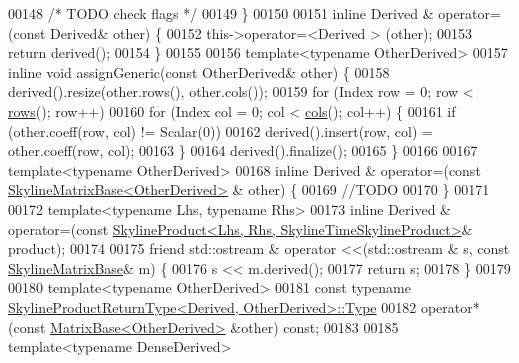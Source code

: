 \begin{DoxyCode}
00148         \textcolor{comment}{/* TODO check flags */}
00149     \}
00150 
00151     \textcolor{keyword}{inline} Derived & operator=(\textcolor{keyword}{const} Derived& other) \{
00152         this->\textcolor{keyword}{operator}=<Derived > (other);
00153         \textcolor{keywordflow}{return} derived();
00154     \}
00155 
00156     \textcolor{keyword}{template}<\textcolor{keyword}{typename} OtherDerived>
00157     \textcolor{keyword}{inline} \textcolor{keywordtype}{void} assignGeneric(\textcolor{keyword}{const} OtherDerived& other) \{
00158         derived().resize(other.rows(), other.cols());
00159         \textcolor{keywordflow}{for} (Index row = 0; row < \hyperlink{class_eigen_1_1_skyline_matrix_base_a8243b2fe6bcc6c3037717fcb0afa9d46}{rows}(); row++)
00160             \textcolor{keywordflow}{for} (Index col = 0; col < \hyperlink{class_eigen_1_1_skyline_matrix_base_aff9cfadb45ffbae8a33b710bc9b49d71}{cols}(); col++) \{
00161                 \textcolor{keywordflow}{if} (other.coeff(row, col) != Scalar(0))
00162                     derived().insert(row, col) = other.coeff(row, col);
00163             \}
00164         derived().finalize();
00165     \}
00166 
00167     \textcolor{keyword}{template}<\textcolor{keyword}{typename} OtherDerived>
00168             \textcolor{keyword}{inline} Derived & operator=(\textcolor{keyword}{const} \hyperlink{class_eigen_1_1_skyline_matrix_base}{SkylineMatrixBase<OtherDerived>}
      & other) \{
00169         \textcolor{comment}{//TODO}
00170     \}
00171 
00172     \textcolor{keyword}{template}<\textcolor{keyword}{typename} Lhs, \textcolor{keyword}{typename} Rhs>
00173             \textcolor{keyword}{inline} Derived & operator=(\textcolor{keyword}{const} 
      \hyperlink{class_eigen_1_1_skyline_product}{SkylineProduct<Lhs, Rhs, SkylineTimeSkylineProduct>}& 
      product);
00174 
00175     \textcolor{keyword}{friend} std::ostream & operator <<(std::ostream & s, \textcolor{keyword}{const} \hyperlink{class_eigen_1_1_skyline_matrix_base}{SkylineMatrixBase}& m) \{
00176         s << m.derived();
00177         \textcolor{keywordflow}{return} s;
00178     \}
00179 
00180     \textcolor{keyword}{template}<\textcolor{keyword}{typename} OtherDerived>
00181     \textcolor{keyword}{const} \textcolor{keyword}{typename} \hyperlink{class_eigen_1_1_skyline_product}{SkylineProductReturnType<Derived, OtherDerived>::Type}
00182     operator*(\textcolor{keyword}{const} \hyperlink{group___core___module_class_eigen_1_1_matrix_base}{MatrixBase<OtherDerived>} &other) \textcolor{keyword}{const};
00183 
00185     \textcolor{keyword}{template}<\textcolor{keyword}{typename} DenseDerived>

\end{DoxyCode}
